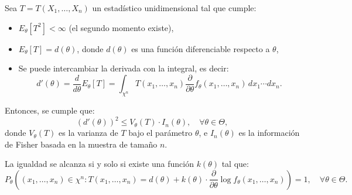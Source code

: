 \begin{teorema}
  Sea $T = T(X_1, \dots, X_n)$ un estadístico unidimensional tal que cumple:
  \begin{itemize}
    \item $E_\theta[T^2] < \infty$ (el segundo momento existe),
    \item $E_\theta[T] = d(\theta)$, donde $d(\theta)$ es una función diferenciable respecto a $\theta$,
    \item Se puede intercambiar la derivada con la integral, es decir:
    $$
    d'(\theta) = \frac{d}{d\theta} E_\theta[T] = \int_{\chi^n} T(x_1, \dots, x_n) \frac{\partial}{\partial \theta} f_\theta(x_1, \dots, x_n) \, dx_1 \cdots dx_n.
    $$
  \end{itemize}
  Entonces, se cumple que:
  $$
  \left(d'(\theta)\right)^2 \leq V_\theta(T) \cdot I_n(\theta), \quad \forall \theta \in \Theta,
  $$
  donde $V_\theta(T)$ es la varianza de $T$ bajo el parámetro $\theta$, e $I_n(\theta)$ es la información de Fisher basada en la muestra de tamaño $n$.

  La igualdad se alcanza si y solo si existe una función $k(\theta)$ tal que:
  $$
    P_\theta\left(\left(x_1, \dots, x_n\right) \in \chi^n : T(x_1, \dots, x_n) = d(\theta) + k(\theta) \cdot \frac{\partial}{\partial \theta} \log f_\theta(x_1, \dots, x_n)\right) = 1, \quad \forall \theta \in \Theta.
  $$
\end{teorema}


